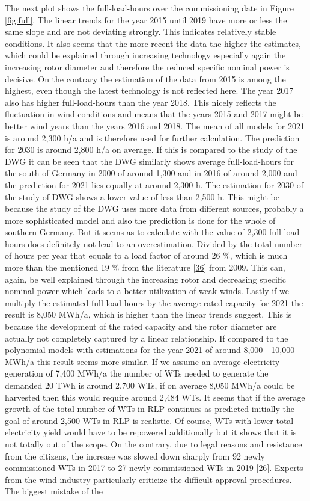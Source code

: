 \documentclass[a4paper,11pt]{article}
\begin{document}
The next plot shows the full-load-hours over the commissioning date in Figure \ref{fig:full}. The linear trends for the year 2015 until 2019 have more or less the same slope and are not deviating strongly. This indicates relatively stable conditions. It also seems that the more recent the data the higher the estimates, which could be explained through increasing technology especially again the increasing rotor diameter and therefore the reduced specific nominal power is decisive. On the contrary the estimation of the data from 2015 is among the highest, even though the latest technology is not reflected here. The year 2017 also has higher full-load-hours than the year 2018. This nicely reflects the fluctuation in wind conditions and means that the years 2015 and 2017 might be better wind years than the years 2016 and 2018. The mean of all models for 2021 is around 2,300 h/a and is therefore used for further calculation. The prediction for 2030 is around 2,800 h/a on average. If this is compared to the study of the DWG it can be seen that the DWG similarly shows average full-load-hours for the south of Germany in 2000 of around 1,300 and in 2016 of around 2,000 and the prediction for 2021 lies equally at around 2,300 h. The estimation for 2030 of the study of DWG shows a lower value of less than 2,500 h. This might be because the study of the DWG uses more data from different sources, probably a more sophisticated model and also the prediction is done for the whole of southern Germany. But it seems as to calculate with the value of 2,300 full-load-hours does definitely not lead to an overestimation. Divided by the total number of hours per year that equals to a load factor of around 26 \%, which is much more than the mentioned 19 \% from the literature {[}\protect\hyperlink{ref-DavidJCMacKay.2009}{36}{]} from 2009. This can, again, be well explained through the increasing rotor and decreasing specific nominal power which leads to a better utilization of weak winds. Lastly if we multiply the estimated full-load-hours by the average rated capacity for 2021 the result is 8,050 MWh/a, which is higher than the linear trends suggest. This is because the development of the rated capacity and the rotor diameter are actually not completely captured by a linear relationship. If compared to the polynomial models with estimations for the year 2021 of around 8,000 - 10,000 MWh/a this result seems more similar. If we assume an average electricity generation of 7,400 MWh/a the number of WTs needed to generate the demanded 20 TWh is around 2,700 WTs, if on average 8,050 MWh/a could be harvested then this would require around 2,484 WTs. It seems that if the average growth of the total number of WTs in RLP continues as predicted initially the goal of around 2,500 WTs in RLP is realistic. Of course, WTs with lower total electricity yield would have to be repowered additionally but it shows that it is not totally out of the scope. On the contrary, due to legal reasons and resistance from the citizens, the increase was slowed down sharply from 92 newly commissioned WTs in 2017 to 27 newly commissioned WTs in 2019 {[}\protect\hyperlink{ref-EnergieagenturRheinlandPfalz.2019}{26}{]}. Experts from the wind industry particularly criticize the difficult approval procedures. The biggest mistake of the 
\end{document}
